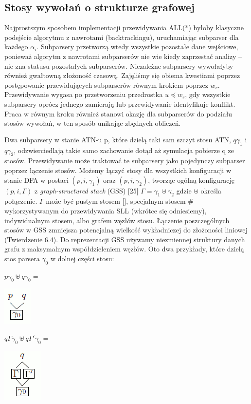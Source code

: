 ﻿\subsection{Stosy wywołań o strukturze grafowej}
Najprostszym sposobem implementacji przewidywania ALL(*) byłoby klasyczne podejście
algorytmu z nawrotami (backtrackingu), uruchamiając subparser dla każdego $\alpha_i$.
Subparsery przetworzą wtedy wszystkie pozostałe dane wejściowe, ponieważ algorytm z nawrotami
subparserów nie wie kiedy zaprzestać analizy – nie zna statusu pozostałych subparserów.
Niezależne subparsery wywołałyby również gwałtowną złożoność czasową.
Zajęliśmy się obiema kwestiami poprzez postępowanie przewidujących subparserów równym krokiem
poprzez $w_r$. Przewidywanie wygasa po przetworzeniu przedrostka $u \preceq w_r$,
gdy wszystkie subparsery oprócz jednego zamierają lub przewidywanie identyfikuje konflikt.
Praca w równym kroku również stanowi okazję dla subparserów do podziału stosów wywołań,
w ten sposób unikając zbędnych obliczeń.
\par
Dwa subparsery w stanie ATN-u p, które dzielą taki sam szczyt stosu ATN,
$q\gamma_1$ i $q\gamma_2$, odzwierciedlają takie samo zachowanie dotąd aż symulacja pobierze q ze stosów.
Przewidywanie może traktować te subparsery jako pojedynczy subparser poprzez łączenie stosów.
Możemy łączyć stosy dla wszystkich konfiguracji w stanie DFA w postaci $(p,i,\gamma_1)$ oraz $(p,i,\gamma_2)$,
tworząc ogólną konfigurację $(p,i,\Gamma)$ z \textit{graph-structured stack} (GSS) [25]
$\Gamma = \gamma_1 \uplus \gamma_2$ gdzie $\uplus$ określa połączenie.
$\Gamma$ może być pustym stosem [], specjalnym stosem \# wykorzystywanym do przewidywania SLL (wkrótce się odniesiemy),
indywidualnym stosem, albo grafem węzłów stosu.
Łączenie poszczególnych stosów w GSS zmniejsza potencjalną wielkość wykładniczej do złożoności liniowej
(Twierdzenie 6.4). Do reprezentacji GSS używamy niezmiennej struktury danych grafu
z maksymalnym współdzieleniem węzłów.
Oto dwa przykłady, które dzielą stos parsera $\gamma_0$ w dolnej części stosu:
\par
\parbox{\columnwidth}{
  \parbox{0.8in}{
    \centering
    $p \gamma_0 \uplus q \gamma_0 =$
  }
  \parbox{0.5in}{
    \centering
    \includegraphics[scale=0.5]{5_1a}
  }
  \parbox{1.3in}{
    \centering
    $q \Gamma \gamma_0 \uplus q \Gamma' \gamma_0 =$
  }
  \parbox{0.5in}{
    \centering
    \includegraphics[scale=0.5]{5_1b}
  }
}
